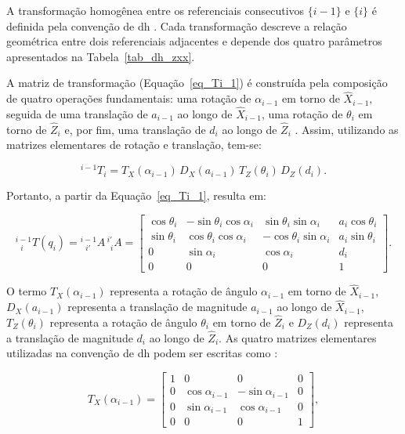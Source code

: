 A transformação homogênea entre os referenciais consecutivos $\{i-1\}$ e $\{i\}$ é definida pela convenção de \gls{dh} \cite{craig2005}.
Cada transformação descreve a relação geométrica entre dois referenciais adjacentes e depende dos quatro parâmetros apresentados na Tabela~\ref{tab_dh_zxx}.

A matriz de transformação (Equação~\ref{eq_Ti_1}) é construída pela composição de quatro operações fundamentais:
uma rotação de $\alpha_{i-1}$ em torno de $\hat{X}_{i-1}$, seguida de uma translação de $a_{i-1}$ ao longo de $\hat{X}_{i-1}$, uma rotação de $\theta_i$ em torno de $\hat{Z}_i$ e, por fim, uma translação de $d_i$ ao longo de $\hat{Z}_i$ \cite{craig2005}.
Assim, utilizando as matrizes elementares de rotação e translação, tem-se:

\begin{equation}
{}^{i-1}T_i
=
T_X(\alpha_{i-1})\,D_X(a_{i-1})\,T_Z(\theta_i)\,D_Z(d_i).
\label{eq_Ti_1}
\end{equation}

Portanto, a partir da Equação~\ref{eq_Ti_1}, resulta em:

\begin{equation}
{}^{i-1}_{\ \ \ i}T(q_i)
=
{}^{i-1}_{\ \ \ i'}A \, {}^{i'}_{\ \ i}A
=
\begin{bmatrix}
\cos\theta_i & -\sin\theta_i \cos\alpha_i & \sin\theta_i \sin\alpha_i & a_i \cos\theta_i \\
\sin\theta_i & \cos\theta_i \cos\alpha_i & -\cos\theta_i \sin\alpha_i & a_i \sin\theta_i \\
0 & \sin\alpha_i & \cos\alpha_i & d_i \\
0 & 0 & 0 & 1
\end{bmatrix}.
\end{equation}

O termo $T_X(\alpha_{i-1})$ representa a rotação de ângulo $\alpha_{i-1}$ em torno de $\hat{X}_{i-1}$,
$D_X(a_{i-1})$ representa a translação de magnitude $a_{i-1}$ ao longo de $\hat{X}_{i-1}$,
$T_Z(\theta_i)$ representa a rotação de ângulo $\theta_i$ em torno de $\hat{Z}_i$ e
$D_Z(d_i)$ representa a translação de magnitude $d_i$ ao longo de $\hat{Z}_i$.
As quatro matrizes elementares utilizadas na convenção de \gls{dh} podem ser escritas como \cite{craig2005}:

\begin{equation}
\label{eq_tx}
T_X(\alpha_{i-1}) =
\begin{bmatrix}
1 & 0 & 0 & 0 \\
0 & \cos\alpha_{i-1} & -\sin\alpha_{i-1} & 0 \\
0 & \sin\alpha_{i-1} &  \cos\alpha_{i-1} & 0 \\
0 & 0 & 0 & 1
\end{bmatrix},
\end{equation}


